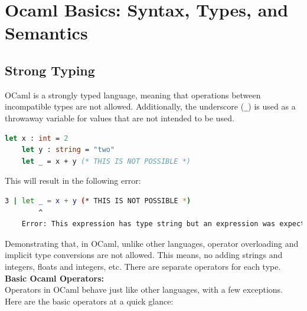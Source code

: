 \section{Ocaml Basics: Syntax, Types, and Semantics}

\subsection*{Strong Typing}

OCaml is a strongly typed language, meaning that operations between incompatible types are not allowed. Additionally, the underscore (\texttt{\_}) is used as a throwaway variable for values that are not intended to be used.

\begin{lstlisting}[language=OCaml, caption={Example of Strong Typing}]
    let x : int = 2
    let y : string = "two"
    let _ = x + y (* THIS IS NOT POSSIBLE *)
\end{lstlisting}

\noindent
This will result in the following error:
\begin{lstlisting}[language=Bash, caption={Error Message}]
    3 | let _ = x + y (* THIS IS NOT POSSIBLE *)
        ^ 
    Error: This expression has type string but an expression was expected of type int
\end{lstlisting}

\noindent
Demonstrating that, in OCaml, unlike other languages, operator overloading and implicit type conversions are not allowed.
This means, no adding strings and integers, floats and integers, etc. There are separate operators for each type.\\

\noindent
\textbf{Basic Ocaml Operators:}\\
Operators in OCaml behave just like other languages, with a few exceptions. Here are the basic operators at a quick
glance:

